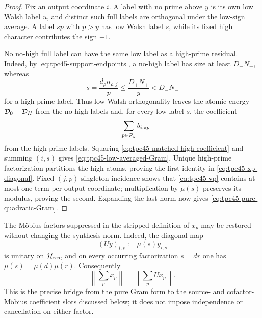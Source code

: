 \begin{proof}
Fix an output coordinate \(i\).  A label with no prime above \(y\) is
its own low Walsh label \(u\), and distinct such full labels are
orthogonal under the low-sign average.  A label \(sp\) with \(p>y\)
has low Walsh label \(s\), while its fixed high character contributes
the sign \(-1\).

No no-high full label can have the same low label as a high-prime
residual.  Indeed, by \eqref{eq:tpc45-support-endpoints}, a no-high label
has size at least \(D_-N_-\), whereas
\begin{equation}
 s=\frac{d_\rho n_{\rho,j}}p
 \le\frac{D_+N_+}{y}<D_-N_-
 \label{eq:tpc45-residual-size-separation}
\end{equation}
for a high-prime label.  Thus low Walsh orthogonality leaves the atomic
energy \(\mathcal D_0-\mathcal D_H\) from the no-high labels and, for every low label
\(s\), the coefficient
\begin{equation}
 -\sum_{p\in\mathcal P_y}b_{i,sp}
 \label{eq:tpc45-matched-high-coefficient}
\end{equation}
from the high-prime labels.  Squaring
\eqref{eq:tpc45-matched-high-coefficient} and summing \((i,s)\) gives
\eqref{eq:tpc45-low-averaged-Gram}.  Unique high-prime factorization
partitions the high atoms, proving the first identity in
\eqref{eq:tpc45-xp-diagonal}.  Fixed-\((j,p)\) singleton incidence shows
that \eqref{eq:tpc45-vp} contains at most one term per output coordinate;
multiplication by \(\mu(s)\) preserves its modulus, proving the second.
Expanding the last norm now gives
\eqref{eq:tpc45-pure-quadratic-Gram}.
\end{proof}

The M\"obius factors suppressed in the stripped definition of \(x_p\)
may be restored without changing the synthesis norm.  Indeed, the
diagonal map
\begin{equation}
 (Uy)_{i,s}:=\mu(s)y_{i,s}
 \label{eq:tpc45-residual-unitary-reweighting}
\end{equation}
is unitary on \(\mathcal H_{\rm res}\), and on every occurring factorization
\(s=dr\) one has \(\mu(s)=\mu(d)\mu(r)\).  Consequently
\begin{equation}
 \left\|\sum_p x_p\right\|
 =\left\|\sum_p Ux_p\right\|.
 \label{eq:tpc45-residual-physical-reweighting}
\end{equation}
This is the precise bridge from the pure Gram form to the source- and
cofactor-M\"obius coefficient slots discussed below; it does not impose
independence or cancellation on either factor.

